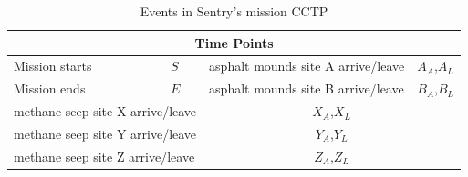 \documentclass[jair,twoside,11pt,theapa]{article}
\begin{document}
\begin{table}[h!]
	\centering
	\begin{tabular}{| m{3cm} m{1.5cm} | m{6cm} m{1.5cm} |}
		\hline
		\multicolumn{4}{|c|}{\textbf{Time Points}} \\
		\hline
		Mission starts & $S$ & asphalt
		mounds site A arrive/leave & $A_A$,$A_L$ \\
		Mission ends & $E$ & asphalt
		mounds site B arrive/leave & $B_A$,$B_L$ \\
		\hline
		\multicolumn{2}{|l}{methane seep site X arrive/leave} &
		\multicolumn{2}{c|}{$X_A$,$X_L$} \\
		\multicolumn{2}{|l}{methane seep site Y arrive/leave} &
		\multicolumn{2}{c|}{$Y_A$,$Y_L$} \\
		\multicolumn{2}{|l}{methane seep site Z arrive/leave} &
		\multicolumn{2}{c|}{$Z_A$,$Z_L$} \\
		\hline
	\end{tabular}
	\caption{Events in Sentry's mission CCTP}
	\label{table:events}
\end{table}
\end{document}
